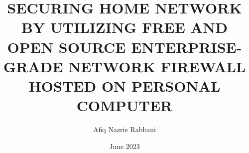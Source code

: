 \documentclass[a4paper, 12pt, oneside, onecolumn, final, openany]{report}
\title{SECURING HOME NETWORK BY UTILIZING FREE AND OPEN SOURCE ENTERPRISE-GRADE NETWORK FIREWALL HOSTED ON PERSONAL COMPUTER}
\date{June 2023}
\author{
	Afiq Nazrie Rabbani
}
\begin{document}
\setcounter{page}{0}




% 




% 

\pagestyle{plain}









% 

\renewcommand*\contentsname{TABLE OF CONTENTS}
\renewcommand*\appendixtocname{LIST OF APPENDICES}
\renewcommand*\listfigurename{LIST OF FIGURES}
\renewcommand*\listtablename{LIST OF TABLES}
\renewcommand*\bibname{REFERENCES}

\tableofcontents
\listofappendices
{%
	\let\oldnumberline\numberline%
	\renewcommand{\numberline}{\figurename~\oldnumberline}%
	\listoffigures%
}
{%
	\let\oldnumberline\numberline%
	\renewcommand{\numberline}{\tablename~\oldnumberline}%
	\listoftables%
}


\renewcommand{\chaptername}{CHAPTER}







\end{document}
